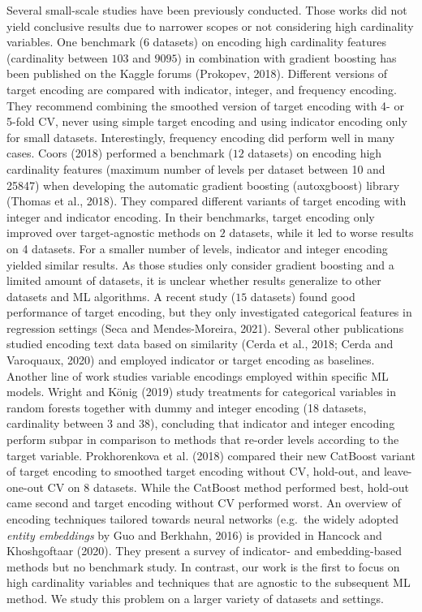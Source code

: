 \documentclass[smallextended]{svjour3}       %
\begin{document}
Several small-scale studies have been previously conducted.
Those works did not yield conclusive results due to narrower scopes or not considering high cardinality variables.
One benchmark (\(6\) datasets) on encoding high cardinality features (cardinality between \(103\) and \(9095\)) in combination with gradient boosting has been published on the Kaggle forums (Prokopev, 2018).
Different versions of target encoding are compared with indicator, integer, and frequency encoding.
They recommend combining the smoothed version of target encoding with 4- or 5-fold CV, never using simple target encoding and using indicator encoding only for small datasets.
Interestingly, frequency encoding did perform well in many cases.
Coors (2018) performed a benchmark (\(12\) datasets) on encoding high cardinality features (maximum number of levels per dataset between 10 and 25847) when developing the automatic gradient boosting (autoxgboost) library (Thomas et al., 2018). They compared different variants of target encoding with integer and indicator encoding. In their benchmarks, target encoding only improved over target-agnostic methods on \(2\) datasets, while it led to worse results on 4 datasets. For a smaller number of levels, indicator and integer encoding yielded similar results.
As those studies only consider gradient boosting and a limited amount of datasets, it is unclear whether results generalize to other datasets and ML algorithms.
A recent study (\(15\) datasets) found good performance of target encoding, but they only investigated categorical features in regression settings (Seca and Mendes-Moreira, 2021).
Several other publications studied encoding text data based on similarity (Cerda et al., 2018; Cerda and Varoquaux, 2020) and employed indicator or target encoding as baselines.
Another line of work studies variable encodings employed within specific ML models.
Wright and König (2019) study treatments for categorical variables in random forests together with dummy and integer encoding (18 datasets, cardinality between \(3\) and \(38\)), concluding that indicator and integer encoding perform subpar in comparison to methods that re-order levels according to the target variable.
Prokhorenkova et al. (2018) compared their new CatBoost variant of target encoding to smoothed target encoding without CV, hold-out, and leave-one-out CV on \(8\) datasets.
While the CatBoost method performed best, hold-out came second and target encoding without CV performed worst.
An overview of encoding techniques tailored towards neural networks (e.g.~the widely adopted \emph{entity embeddings} by Guo and Berkhahn, 2016) is provided in Hancock and Khoshgoftaar (2020).
They present a survey of indicator- and embedding-based methods but no benchmark study.
In contrast, our work is the first to focus on high cardinality variables and techniques that are agnostic to the subsequent ML method.
We study this problem on a larger variety of datasets and settings.
\newline
\end{document}
